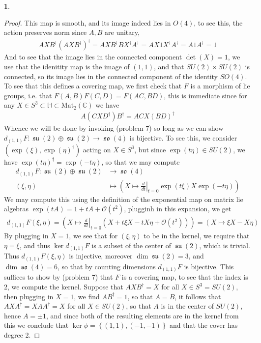 \documentclass[10.5pt]{article}
\theoremstyle{definition}
\newtheorem{pb}{}
\newcommand{\set}[1]{\left\{#1\right\}}
\newcommand{\spu}{\operatorname{\mathfrak{su}}}
\newcommand{\spo}{\operatorname{\mathfrak{so}}}
\begin{document}
\begin{pb}
\begin{proof}
            This map is smooth, and its image indeed lies in \(O(4)\), to see this, the action preserves norm since \(A,B\) are unitary,
            \begin{align*}
                AXB^\dagger (AXB^{\dagger})^\dagger = AXB^{\dagger}BX^{\dagger}A^{\dagger} = AX1X^{\dagger}A^\dagger = A1A^\dagger = 1
            \end{align*} And to see that the image lies in the connected component \(\det(X) = 1\), we use that the idenitity map is the image of \((1,1)\), and that \(SU(2)\times SU(2)\) is connected, so its image lies in the connected component of the identity \(SO(4)\). To see that this defines a covering map, we first check that \(F\) is a morphism of lie groups, i.e. that \(F(A,B)F(C,D) = F(AC,BD)\), this is immediate since for any \(X \in S^3 \subset \mathbb{H} \subset \text{Mat}_2(\mathbb{C})\) we have
            \begin{align*}
                A(CXD^\dagger)B^{\dagger} = ACX(BD)^\dagger
            \end{align*}
            Whence we will be done by invoking (problem 7) so long as we can show \(d_{(1,1)}F: \spu(2) \oplus \spu(2) \to \spo(4)\) is bijective. To see this, we consider \((\exp(\xi),\exp(\eta)^\dagger)\) acting on \(X \in S^3\), but since \(\exp(t\eta) \in SU(2)\), we have \(\exp(t\eta)^\dagger = \exp(-t\eta)\), so that we may compute
            \begin{align*}
                d_{(1,1)}F: \spu(2) \oplus \spu(2) &\to \spo(4) \\
                (\xi,\eta) &\mapsto \left(X \mapsto \left.\frac{d}{dt}\right\vert_{t=0} \exp(t\xi)X \exp(-t\eta)\right)
            \end{align*}
            We may compute this using the definition of the exponential map on matrix lie algebras \(\exp(tA) = 1 + tA + \mathcal{O}(t^2)\), plugginh in this expansion, we get
            \begin{align*}
                d_{(1,1)}F(\xi,\eta) = \left(X\mapsto \left.\frac{d}{dt}\right\vert_{t=0} \left(X + t\xi X - tX\eta + \mathcal{O}(t^2)\right)\right) = (X \mapsto \xi X - X \eta)
            \end{align*}
            By plugging in \(X = 1\), we see that for \((\xi,\eta)\) to be in the kernel, we require that \(\eta = \xi\), and thus \(\ker d_{(1,1)}F\) is a subset of the center of \(\spu(2)\), which is trivial. Thus \(d_{(1,1)}F(\xi,\eta)\) is injective, moreover \(\dim\spu(2) = 3\), and \(\dim \spo(4) = 6\), so that by counting dimensions \(d_{(1,1)}F\) is bijective. This suffices to show by (problem 7) that \(F\) is a covering map, to see that the index is \(2\), we compute the kernel. Suppose that \(AXB^{\dagger} = X\) for all \(X \in S^3 = SU(2)\), then plugging in \(X = 1\), we find \(AB^{\dagger} = 1\), so that \(A = B\), it follows that \(AXA^{\dagger} = XAA^{\dagger} = X\) for all \(X \in SU(2)\), so that \(A\) is in the center of \(SU(2)\), hence \(A = \pm 1\), and since both of the resulting elements are in the kernel from this we conclude that \(\ker \phi = \set{(1,1),(-1,-1)}\) and that the cover has degree 2.
        \end{proof}
    \end{pb}
\end{document}

